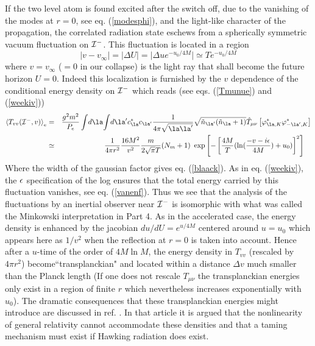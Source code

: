If the two level atom is found excited after
the switch off, due to the vanishing of the modes at $r=0$, see eq.
(\ref{modesphi}), and the light-like character of the propagation, the
correlated radiation state eschews from
a spherically symmetric vacuum fluctuation on ${\cal
I}^-$.
This fluctuation
is located in a region
\begin{equation}
\vert v  -
v_\infty\vert=\vert \Delta U\vert=\vert {\Delta u e^{- u_0 / 4 M}}\vert
\simeq T e^{- u_0 / 4 M}
\label{blaack}
\end{equation}
where $v = v_\infty$ ($=0$ in our
collapse) is the light ray that
shall become the
future horizon $U=0$.
Indeed this localization is furnished by the
$v$ dependence of the
conditional energy density
 on ${\cal I}^-$ which reads (see eqs. (\ref{Tmunue}) and (\ref{weekiv}))
\begin{eqnarray}
\bk{T_{vv}({\cal I^-},v)}_{e}
&=& { g^2 m^2 \over P_{e}} \int\! d\la \!\int
\!d\la^\prime c_\la^* c_{\la^\prime}
{1 \over 4 \pi \sqrt{\la\la^\prime} }\sqrt{
\tilde n_{\la^\prime} ( \tilde n_\la +1)
}\hat T_{\mu
\nu }
\left[
 \varphi^*_{\la,K}
\varphi^*_{-\la^\prime,K}\right]
\nonumber\\
&\simeq & {1 \over 4 \pi r^2}{16 M^2 \over v^2} {m  \over  2 \sqrt{\pi} T }
(N_{m} +1)\ \exp \left[
-\left[
{ 4 M  \over T}  (  \ln ({-v-i\e
\over 4M}) + u_0 )
\right]^2\right]\quad
\label{epsilfr}
\end{eqnarray}
Where the width of the gaussian factor gives eq. (\ref{blaack}).
As in eq. (\ref{weekiv}), the $\mbox{$ \epsilon $}$ specification of the log ensures
that the total energy carried by this fluctuation vanishes, see eq.
(\ref{vanenf}).
Thus
we see that the analysis of the fluctuations by an inertial observer near
${\cal I}^-$ is isomorphic with what was called the Minkowski interpretation
in Part 4.
 As in the accelerated case, the energy density is
enhanced
by the jacobian $du/dU= e^{u / 4 M}$ centered around $u=u_0$ which appears here
as
$1/v^2$ when the reflection at $r=0$ is taken into account. Hence after a
$u$-time of the order of $4M \ln M$, the energy density in $T_{vv}$
(rescaled by $ 4 \pi r^2$)
become``transplanckian" and located within a
distance $\Delta v$ much smaller than the Planck length
(If one does not rescale $T_{\mu\nu}$
the transplanckian energies only exist in a region of finite $r$
which nevertheless increases exponentially with $u_0$).
The dramatic consequences that these transplanckian energies might introduce
are discussed in ref. \cite{EMP}. In that article it is argued that the
nonlinearity of general relativity cannot accommodate these densities and
that  a taming mechanism must exist if Hawking radiation does exist.

